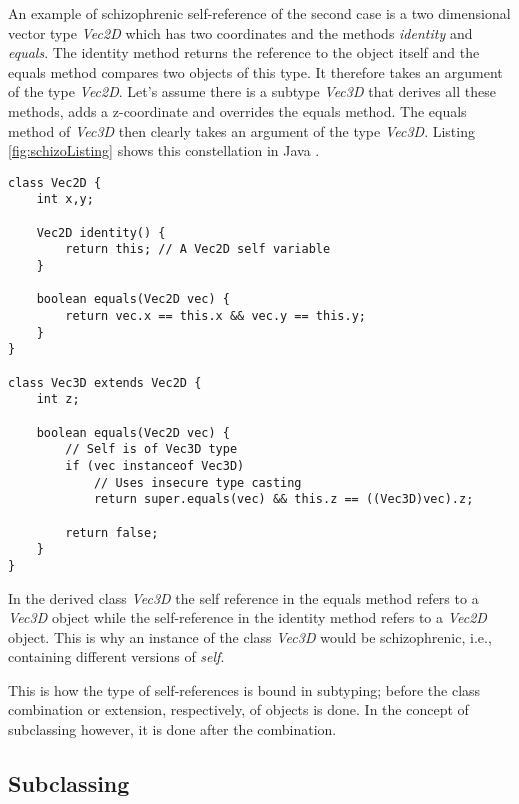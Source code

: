 An example of schizophrenic self-reference of the second case is a two
dimensional vector type \emph{Vec2D} which has two coordinates and the
methods \emph{identity} and \emph{equals}. The identity method returns
the reference to the object itself and the equals method compares
two objects of this type. It therefore takes an argument of the type
\emph{Vec2D}. Let's assume there is a subtype \emph{Vec3D} that derives all
these methods, adds a z-coordinate and overrides the equals method. The
equals method of \emph{Vec3D} then clearly takes an argument of the type
\emph{Vec3D}. Listing \ref{fig:schizoListing} shows this constellation
in Java \cite{simons_theory_2003-2}.

\begin{lstlisting}[float=ht,caption={An example of schizophrenic self-reference.},label={fig:schizoListing}]
class Vec2D {
	int x,y;

	Vec2D identity() {
		return this; // A Vec2D self variable
	}

	boolean equals(Vec2D vec) {
		return vec.x == this.x && vec.y == this.y;
	}
}

class Vec3D extends Vec2D {
	int z;

	boolean equals(Vec2D vec) {
		// Self is of Vec3D type
		if (vec instanceof Vec3D)
			// Uses insecure type casting
			return super.equals(vec) && this.z == ((Vec3D)vec).z;

		return false;
	}
}
\end{lstlisting}

In the derived class \emph{Vec3D} the self reference in the equals
method refers to a \emph{Vec3D} object while the self-reference in the identity method
refers to a \emph{Vec2D} object. This is why an instance of the class
\emph{Vec3D} would be schizophrenic, i.e., containing different versions
of \emph{self}.

This is how the type of self-references is bound in subtyping; before
the class combination or extension, respectively, of objects is done.
In the concept of subclassing however, it is done after the combination.

\subsection{Subclassing}

